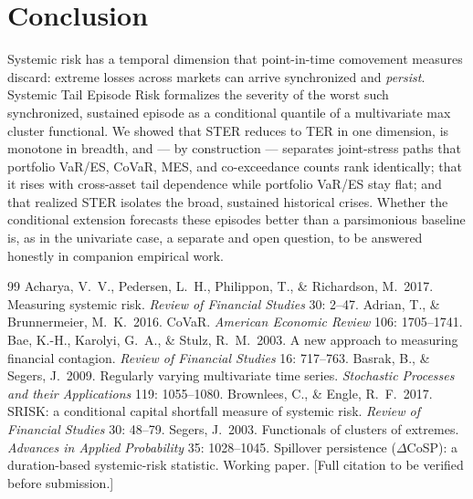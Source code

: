 \documentclass[11pt]{article}
\begin{document}
\section{Conclusion}
Systemic risk has a temporal dimension that point-in-time comovement measures discard: extreme losses across
markets can arrive synchronized and \emph{persist}. Systemic Tail Episode Risk formalizes the severity of the
worst such synchronized, sustained episode as a conditional quantile of a multivariate max cluster
functional. We showed that STER reduces to TER in one dimension, is monotone in breadth, and --- by
construction --- separates joint-stress paths that portfolio VaR/ES, CoVaR, MES, and co-exceedance counts
rank identically; that it rises with cross-asset tail dependence while portfolio VaR/ES stay flat; and that
realized STER isolates the broad, sustained historical crises. Whether the conditional extension forecasts
these episodes better than a parsimonious baseline is, as in the univariate case, a separate and open
question, to be answered honestly in companion empirical work.

\begin{thebibliography}{99}
 Acharya, V.\ V., Pedersen, L.\ H., Philippon, T., \& Richardson, M.\ 2017. Measuring systemic risk. \emph{Review of Financial Studies} 30: 2--47.
 Adrian, T., \& Brunnermeier, M.\ K.\ 2016. CoVaR. \emph{American Economic Review} 106: 1705--1741.
 Bae, K.-H., Karolyi, G.\ A., \& Stulz, R.\ M.\ 2003. A new approach to measuring financial contagion. \emph{Review of Financial Studies} 16: 717--763.
 Basrak, B., \& Segers, J.\ 2009. Regularly varying multivariate time series. \emph{Stochastic Processes and their Applications} 119: 1055--1080.
 Brownlees, C., \& Engle, R.\ F.\ 2017. SRISK: a conditional capital shortfall measure of systemic risk. \emph{Review of Financial Studies} 30: 48--79.
 Segers, J.\ 2003. Functionals of clusters of extremes. \emph{Advances in Applied Probability} 35: 1028--1045.
 Spillover persistence ($\Delta$CoSP): a duration-based systemic-risk statistic. Working paper. [Full citation to be verified before submission.]
\end{thebibliography}
\end{document}
